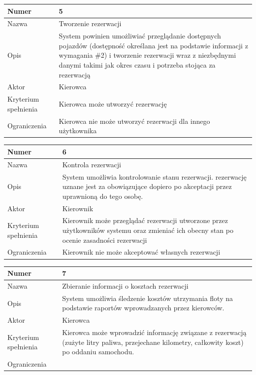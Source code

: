 \documentclass[eng,printmode,openany]{mgr}
\begin{document}
	\begin{table}[H]
		\begin{tabularx}{\textwidth}{|l|X|}
			\hline
			Numer                & 5 \\ \hline
			Nazwa                & Tworzenie rezerwacji \\ \hline
			Opis                 & System powinien umożliwiać przeglądanie dostępnych pojazdów (dostępność określana jest na podstawie informacji z wymagania \#2) i tworzenie rezerwacji wraz z niezbędnymi danymi takimi jak okres czasu i potrzeba stojąca za rezerwacją\\ \hline
			Aktor                & Kierowca \\ \hline
			Kryterium spełnienia & Kierowca może utworzyć rezerwację \\ \hline
			Ograniczenia         & Kierowca nie może utworzyć rezerwacji dla innego użytkownika \\ \hline
		\end{tabularx}
	\end{table}
	
	\begin{table}[H]
		\begin{tabularx}{\textwidth}{|l|X|}
			\hline
			Numer                & 6 \\ \hline
			Nazwa                & Kontrola rezerwacji\\ \hline
			Opis                 & System umożliwia kontrolowanie stanu rezerwacji. rezerwację uznane jest za obowiązujące dopiero po akceptacji przez uprawnioną do tego osobę.\\ \hline
			Aktor                & Kierownik \\ \hline
			Kryterium spełnienia & Kierownik może przeglądać rezerwacji utworzone przez użytkowników systemu oraz zmieniać ich obecny stan po ocenie zasadności rezerwacji \\ \hline
			Ograniczenia         & Kierownik nie może akceptować własnych rezerwacji \\ \hline
		\end{tabularx}
	\end{table}
	
	\begin{table}[H]
		\begin{tabularx}{\textwidth}{|l|X|}
			\hline
			Numer                & 7 \\ \hline
			Nazwa                & Zbieranie informacji o kosztach rezerwacji\\ \hline
			Opis                 & System umożliwia śledzenie kosztów utrzymania floty na podstawie raportów wprowadzanych przez kierowców. \\ \hline
			Aktor                & Kierowca\\ \hline
			Kryterium spełnienia & Kierowca może wprowadzić informację związane z rezerwacją (zużyte litry paliwa, przejechane kilometry, całkowity koszt) po oddaniu samochodu.\\ \hline
			Ograniczenia         & \\ \hline
		\end{tabularx}
	\end{table}
	
\end{document}
